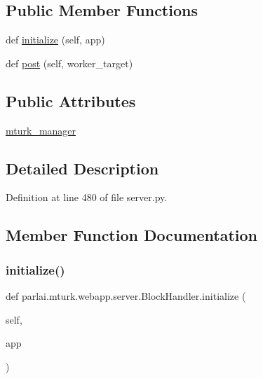 \subsection*{Public Member Functions}
\begin{DoxyCompactItemize}
\item 
def \hyperlink{classparlai_1_1mturk_1_1webapp_1_1server_1_1BlockHandler_a65b2ae9ac54dc74f947e560654c5d6c3}{initialize} (self, app)
\item 
def \hyperlink{classparlai_1_1mturk_1_1webapp_1_1server_1_1BlockHandler_a8c9de27cced3819aaec3909b50d3b550}{post} (self, worker\+\_\+target)
\end{DoxyCompactItemize}
\subsection*{Public Attributes}
\begin{DoxyCompactItemize}
\item 
\hyperlink{classparlai_1_1mturk_1_1webapp_1_1server_1_1BlockHandler_a478088460fbd6c910d6ca6bcb01b7016}{mturk\+\_\+manager}
\end{DoxyCompactItemize}


\subsection{Detailed Description}


Definition at line 480 of file server.\+py.



\subsection{Member Function Documentation}
\mbox{\label{classparlai_1_1mturk_1_1webapp_1_1server_1_1BlockHandler_a65b2ae9ac54dc74f947e560654c5d6c3}} 
\subsubsection{\texorpdfstring{initialize()}{initialize()}}
{\footnotesize\ttfamily def parlai.\+mturk.\+webapp.\+server.\+Block\+Handler.\+initialize (\begin{DoxyParamCaption}\item[{}]{self,  }\item[{}]{app }\end{DoxyParamCaption})}



